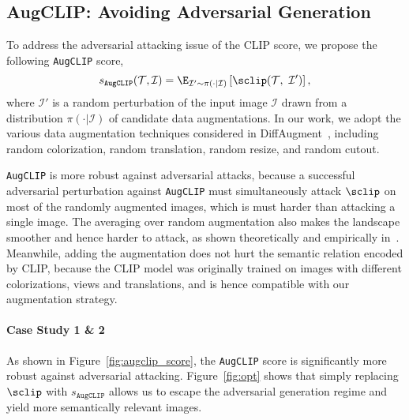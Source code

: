 \documentclass[10pt,twocolumn,letterpaper]{article}
\newcommand{\ourloss}{\texttt{AugCLIP}}
\begin{document}
\subsection{AugCLIP: Avoiding Adversarial Generation}
\label{subsec:augclip}
To address the adversarial attacking issue of the CLIP score, 
we propose the following {\ourloss} score, 
\begin{equation}
\label{eq:augclip}
    s_{\ourloss}(\mathcal{T}, \mathcal{I}) = \E_{\mathcal I' \sim \pi(\cdot|\mathcal I)} \left [\sclip(\mathcal{T},~ \mathcal{I}') \right],
\end{equation}
where $\mathcal I'$ is a random perturbation 
of the input image $\mathcal I$ drawn from a distribution $\pi(\cdot|\mathcal I)$ of candidate data augmentations. In our work, we adopt the various data augmentation techniques considered in DiffAugment~\cite{zhao2020differentiable},  
including random colorization, random translation, random resize, and random cutout.

{\ourloss} is more robust against adversarial attacks, because a successful adversarial perturbation against {\ourloss} must simultaneously attack $\sclip$ on most of the randomly augmented images, which is must harder than attacking a single image. The averaging over random augmentation also makes the  landscape smoother and hence harder to attack, as shown theoretically and empirically in~\cite{cohen2019certified, salman2019provably}.
Meanwhile, adding the augmentation  
does not hurt the semantic relation encoded by CLIP, because the CLIP model was originally trained on images with different colorizations, views and translations, and is hence compatible with our augmentation strategy. 


\paragraph{Case Study 1 \& 2}
As shown in Figure~\ref{fig:augclip_score}, 
the {\ourloss} 
score is significantly more robust against adversarial attacking. 
Figure~\ref{fig:opt} shows that simply replacing $\sclip$ with $s_{\ourloss}$ allows us to escape the adversarial generation regime and yield more semantically relevant images. 
\end{document}
